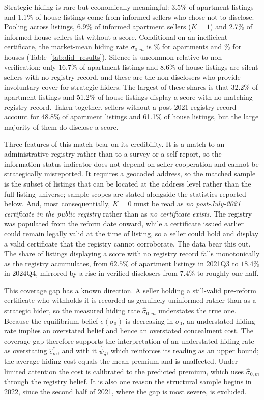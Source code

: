 \noindent Strategic hiding is rare but economically meaningful: 3.5\% of apartment listings and 1.1\% of house listings come from informed sellers who chose not to disclose. Pooling across listings, 6.9\% of informed apartment sellers ($K=1$) and 2.7\% of informed house sellers list without a score. Conditional on an inefficient certificate, the market-mean hiding rate $\hat\sigma_{0,m}$ is \attSigmaObsApt{}\% for apartments and \attSigmaObsHouse{}\% for houses (Table~\ref{tab:did_results}). Silence is uncommon relative to non-verification: only 16.7\% of apartment listings and 8.6\% of house listings are silent sellers with no registry record, and these are the non-disclosers who provide involuntary cover for strategic hiders. The largest of these shares is that 32.2\% of apartment listings and 51.2\% of house listings display a score with no matching registry record. Taken together, sellers without a post-2021 registry record account for 48.8\% of apartment listings and 61.1\% of house listings, but the large majority of them do disclose a score.

Three features of this match bear on its credibility. It is a match to an administrative registry
rather than to a survey or a self-report, so the information-status indicator does not depend on
seller cooperation and cannot be strategically misreported. It requires a geocoded address, so the
matched sample is the subset of listings that can be located at the address level rather than the
full listing universe; sample scopes are stated alongside the statistics reported below. And, most
consequentially, $K=0$ must be read as \emph{no post-July-2021 certificate in the public registry}
rather than as \emph{no certificate exists}. The registry was populated from the reform date
onward, while a certificate issued earlier could remain legally valid at the time of listing, so a
seller could hold and display a valid certificate that the registry cannot corroborate. The data
bear this out. The share of listings displaying a score with no registry record falls monotonically
as the registry accumulates, from $62.5\%$ of apartment listings in 2021Q3 to $18.4\%$ in 2024Q4,
mirrored by a rise in verified disclosers from $7.4\%$ to roughly one half.

This coverage gap has a known direction. A seller holding a still-valid pre-reform certificate who
withholds it is recorded as genuinely uninformed rather than as a strategic hider, so the measured
hiding rate $\hat\sigma_{0,m}$ understates the true one. Because the equilibrium belief
$e(\sigma_0)$ is decreasing in $\sigma_0$, an understated hiding rate implies an overstated belief
and hence an overstated concealment cost. The coverage gap therefore supports the
interpretation of an understated hiding rate as overstating $\hat e^*_m$, and with it $\hat\psi_\delta$, which reinforces its reading as an upper bound; the average hiding cost equals the mean premium and is unaffected. Under limited attention the cost is calibrated to the predicted premium, which uses $\hat\sigma_{0,m}$ through the registry belief. It is also one reason the
structural sample begins in 2022, since the second half of 2021, where the gap is most severe, is
excluded.

